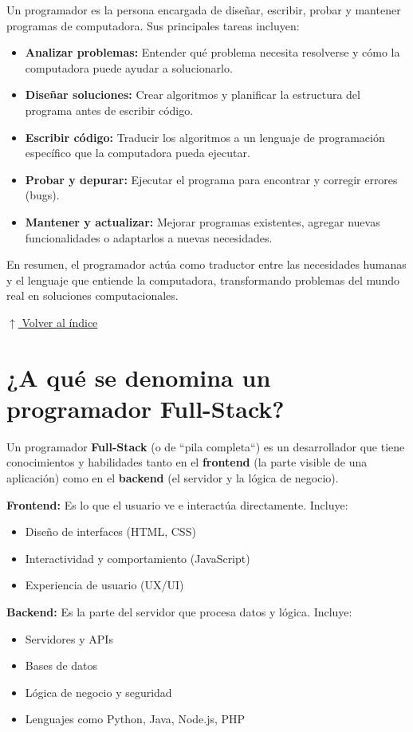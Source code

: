 \documentclass[12pt]{article}
\newcommand{\volverindice}{%
    \vspace{1em}%
    \begin{flushright}%
        \hyperlink{indice}{\small $\uparrow$ Volver al índice}%
    \end{flushright}%
}
\begin{document}
Un programador es la persona encargada de diseñar, escribir, probar y mantener programas de computadora. Sus principales tareas incluyen:

\begin{itemize}
    \item \textbf{Analizar problemas:} Entender qué problema necesita resolverse y cómo la computadora puede ayudar a solucionarlo.
    \item \textbf{Diseñar soluciones:} Crear algoritmos y planificar la estructura del programa antes de escribir código.
    \item \textbf{Escribir código:} Traducir los algoritmos a un lenguaje de programación específico que la computadora pueda ejecutar.
    \item \textbf{Probar y depurar:} Ejecutar el programa para encontrar y corregir errores (bugs).
    \item \textbf{Mantener y actualizar:} Mejorar programas existentes, agregar nuevas funcionalidades o adaptarlos a nuevas necesidades.
\end{itemize}

En resumen, el programador actúa como traductor entre las necesidades humanas y el lenguaje que entiende la computadora, transformando problemas del mundo real en soluciones computacionales.

\volverindice
\newpage


\section{¿A qué se denomina un programador Full-Stack?}

Un programador \textbf{Full-Stack} (o de ``pila completa``) es un desarrollador que tiene conocimientos y habilidades tanto en el \textbf{frontend} (la parte visible de una aplicación) como en el \textbf{backend} (el servidor y la lógica de negocio).

\textbf{Frontend:} Es lo que el usuario ve e interactúa directamente. Incluye:
\begin{itemize}
    \item Diseño de interfaces (HTML, CSS)
    \item Interactividad y comportamiento (JavaScript)
    \item Experiencia de usuario (UX/UI)
\end{itemize}

\textbf{Backend:} Es la parte del servidor que procesa datos y lógica. Incluye:
\begin{itemize}
    \item Servidores y APIs
    \item Bases de datos
    \item Lógica de negocio y seguridad
    \item Lenguajes como Python, Java, Node.js, PHP
\end{itemize}
\end{document}
